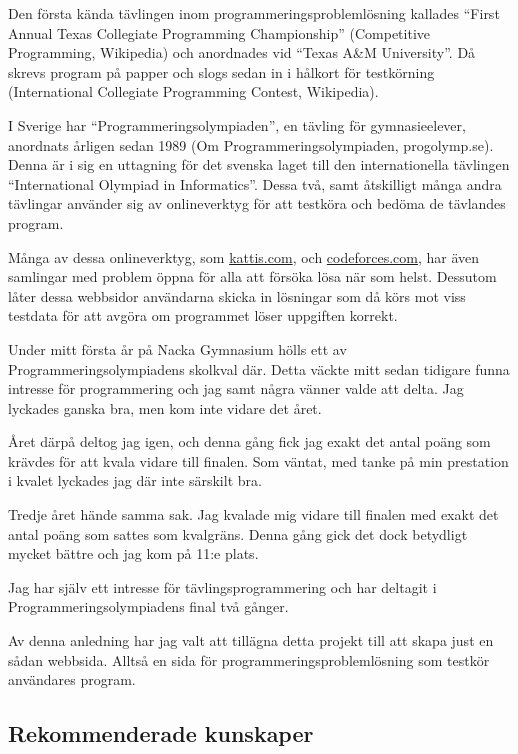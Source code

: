\documentclass{article}
\begin{document}
Den första kända tävlingen inom programmeringsproblemlösning kallades ``First
Annual Texas Collegiate Programming Championship'' (Competitive Programming,
Wikipedia) och anordnades vid ``Texas A\&M University''. Då skrevs program på
papper och slogs sedan in i hålkort för testkörning (International Collegiate
Programming Contest, Wikipedia).

I Sverige har ``Programmeringsolympiaden'', en tävling för gymnasieelever,
anordnats årligen sedan 1989 (Om Programmeringsolympiaden, progolymp.se). Denna
är i sig en uttagning för det svenska laget till den internationella tävlingen
``International Olympiad in Informatics''.  Dessa två, samt åtskilligt många
andra tävlingar använder sig av onlineverktyg för att testköra och bedöma de
tävlandes program.

Många av dessa onlineverktyg, som \href{https://open.kattis.com}{kattis.com},
och \href{https://codefoces.com}{codeforces.com}, har även samlingar med problem
öppna för alla att försöka lösa när som helst. Dessutom låter dessa webbsidor
användarna skicka in lösningar som då körs mot viss testdata för att avgöra om
programmet löser uppgiften korrekt.

Under mitt första år på Nacka Gymnasium hölls ett av Programmeringsolympiadens
skolkval där. Detta väckte mitt sedan tidigare funna intresse för programmering
och jag samt några vänner valde att delta. Jag lyckades ganska bra, men kom inte
vidare det året.

Året därpå deltog jag igen, och denna gång fick jag exakt det antal poäng
som krävdes för att kvala vidare till finalen. Som väntat, med tanke på min
prestation i kvalet lyckades jag där inte särskilt bra.

Tredje året hände samma sak. Jag kvalade mig vidare till finalen med exakt det
antal poäng som sattes som kvalgräns. Denna gång gick det dock betydligt mycket
bättre och jag kom på 11:e plats.



Jag har själv ett intresse för tävlingsprogrammering och har deltagit i
Programmeringsolympiadens final två gånger.

Av denna anledning har jag valt att tillägna detta projekt till att skapa just
en sådan webbsida. Alltså en sida för programmeringsproblemlösning som testkör
användares program.

\subsection{Rekommenderade kunskaper}
\end{document}
